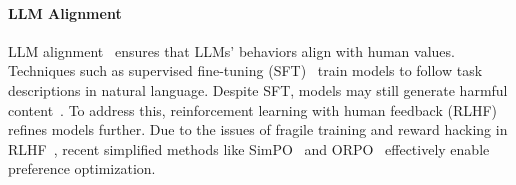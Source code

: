 \paragraph{LLM Alignment}  
LLM alignment~\cite{gabriel2020artificial} ensures that LLMs' behaviors align with human values. Techniques such as supervised fine-tuning (SFT)~\cite{wei2021finetuned, wang2023far, mishra2021cross, wang-etal-2024-uncertainty} train models to follow task descriptions in natural language. Despite SFT, models may still generate harmful content~\cite{carlini2021extracting, gehman2020realtoxicityprompts,zhang-etal-2025-intention}. To address this, reinforcement learning with human feedback (RLHF)~\cite{stiennon2020learning, ouyang2022training} refines models further. Due to the issues of fragile training and reward hacking in RLHF~\cite{miao2024inform}, recent simplified methods like SimPO~\cite{meng2024simpo} and ORPO~\cite{hong2403orpo} effectively enable preference optimization.